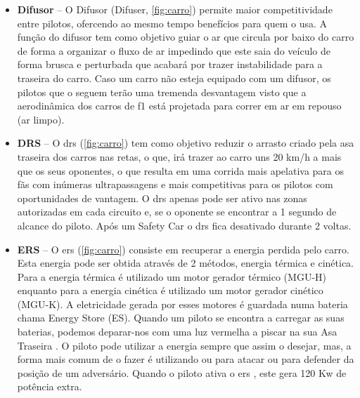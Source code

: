 \documentclass{report}
\begin{document}
\begin{itemize}
\item \textbf{Difusor} – O Difusor \cite{difusor} (Difuser, \autoref{fig:carro}) permite maior competitividade entre pilotos, ofercendo ao mesmo tempo benefícios para quem o usa. A função do difusor \cite{difusor} tem como objetivo guiar o ar que circula por baixo do carro de forma a organizar o fluxo de ar impedindo que este saia do veículo de forma brusca e perturbada que acabará por trazer instabilidade para a traseira do carro. Caso um carro não esteja equipado com um difusor, os pilotos que o seguem terão uma tremenda desvantagem visto que a aerodinâmica dos carros de \ac{f1} está projetada para correr em ar em repouso (ar limpo).

\item \textbf{DRS} – O \ac{drs} \cite{drs} (\autoref{fig:carro}) tem como objetivo reduzir o arrasto criado pela asa traseira dos carros nas retas, o que, irá trazer ao carro uns 20 km/h a mais que os seus oponentes, o que resulta em uma corrida mais apelativa para os fãs com inúmeras ultrapassagens e mais competitivas para os pilotos com oportunidades de vantagem. O \ac{drs} \cite{drs} apenas pode ser ativo nas zonas autorizadas em cada circuito e, se o oponente se encontrar a 1 segundo de alcance do piloto. Após um Safety Car \cite{safetycar} o \ac{drs} \cite{drs} fica desativado durante 2 voltas.

\item \textbf{ERS} – O \ac{ers} \cite{ers} (\autoref{fig:carro}) consiste em recuperar a energia perdida pelo carro. Esta energia pode ser obtida através de 2 métodos, energia térmica e cinética. Para a energia térmica é utilizado um motor gerador térmico (MGU-H) enquanto para a energia cinética é utilizado um motor gerador cinético (MGU-K). A eletricidade gerada por esses motores é guardada numa bateria chama Energy Store (ES).
Quando um piloto se encontra a carregar as suas baterias, podemos deparar-nos com uma luz vermelha a piscar na sua Asa Traseira \cite{rearwing}.
O piloto pode utilizar a energia sempre que assim o desejar, mas, a forma mais comum de o fazer é utilizando ou para atacar ou para defender da posição de um adversário. Quando o piloto ativa o \ac{ers} \cite{ers}, este gera 120 Kw de potência extra.


\end{itemize}
\end{document}
